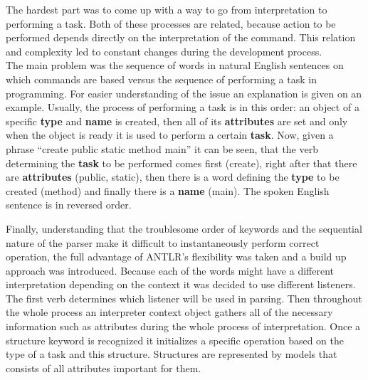 The hardest part was to come up with a way to go from interpretation to performing a task. Both of these processes are related, because action to be performed depends directly on the interpretation of the command. This relation and complexity led to constant changes during the development process. \\
The main problem was the sequence of words in natural English sentences on which commands are based versus the sequence of performing a task in programming. For easier understanding of the issue an explanation is given on an example. Usually, the process of performing a task is in this order: an object of a specific \textbf{type} and \textbf{name} is created, then all of its \textbf{attributes} are set and only when the object is ready it is used to perform a certain \textbf{task}. Now, given a phrase ``create public static method main'' it can be seen, that the verb determining the \textbf{task} to be performed comes first (create), right after that there are \textbf{attributes} (public, static), then there is a word defining the \textbf{type} to be created (method) and finally there is a \textbf{name} (main). The spoken English sentence is in reversed order.

Finally, understanding that the troublesome order of keywords and the sequential nature of the parser make it difficult to instantaneously perform correct operation, the full advantage of ANTLR's flexibility was taken and a build up approach was introduced. Because each of the words might have a different interpretation depending on the context it was decided to use different listeners. The first verb determines which listener will be used in parsing. Then throughout the whole process an interpreter context object gathers all of the necessary information such as attributes during the whole process of interpretation. Once a structure keyword is recognized it initializes a specific operation based on the type of a task and this structure. Structures are represented by models that consists of all attributes important for them. 

